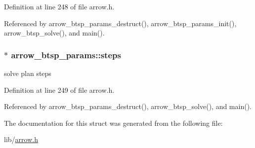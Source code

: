 Definition at line 248 of file arrow.h.

Referenced by arrow\_\-btsp\_\-params\_\-destruct(), arrow\_\-btsp\_\-params\_\-init(), arrow\_\-btsp\_\-solve(), and main().\hypertarget{structarrow__btsp__params_49aedb95b2fc4a725e3bb8485470484b}{
\subsubsection{$\ast$ {\bf arrow\_\-btsp\_\-params::steps}}}
\label{structarrow__btsp__params_49aedb95b2fc4a725e3bb8485470484b}


solve plan steps 

Definition at line 249 of file arrow.h.

Referenced by arrow\_\-btsp\_\-params\_\-destruct(), arrow\_\-btsp\_\-solve(), and main().

The documentation for this struct was generated from the following file:\begin{CompactItemize}
\item 
lib/\hyperlink{arrow_8h}{arrow.h}\end{CompactItemize}
